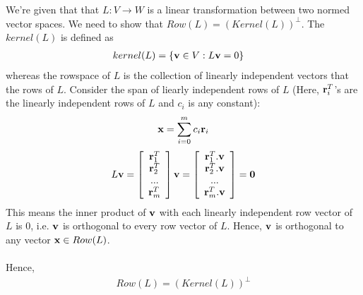\documentclass[12pt, a4paper]{article}
\begin{document}
We're given that that $L : V \rightarrow W$ is a linear transformation between two normed vector spaces. We need to show that $Row (L) = (Kernel (L))^{\perp}$.
The $kernel(L)$ is defined as
\begin{align*}
    kernel(L) &= \{ \textbf{v} \in V : L \textbf{v} = 0 \}
\end{align*}
whereas the rowspace of $L$ is the collection of linearly independent vectors that the rows of $L$.
Consider the span of liearly independent rows of $L$ (Here, $\textbf{r}_i^T$'s are the linearly independent rows of $L$ and $c_i$ is any constant):
\begin{align*}
    \textbf{x} = \sum_{i=0}^{m} c_i \textbf{r}_i
\end{align*}
\begin{align*}
    L\textbf{v} = \left[ {\begin{array}{c}
        \textbf{r}_1^T\\
        \textbf{r}_2^T\\
        ... \\
        \textbf{r}_m^T
    \end{array} } \right] \textbf{v}
    =
    \left[ {\begin{array}{c}
        \textbf{r}_1^T.\textbf{v}\\
        \textbf{r}_2^T.\textbf{v}\\
        ... \\
        \textbf{r}_m^T.\textbf{v}
    \end{array} } \right]
    = \textbf{0}
\end{align*}
This means the inner product of  $\textbf{v}$ with each linearly independent row vector of $L$ is 0, i.e. $\textbf{v}$ is orthogonal to every row vector of $L$. Hence, $\textbf{v}$ is orthogonal to any vector $\textbf{x} \in Row(L)$.\\ \\
Hence, 
\begin{align*}
    Row(L) = (Kernel(L))^{\perp}
\end{align*}

\newpage
\end{document}
